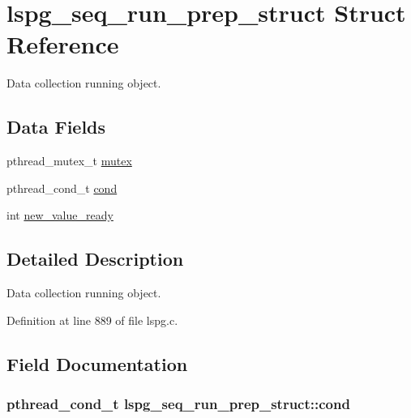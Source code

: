 \hypertarget{structlspg__seq__run__prep__struct}{\section{lspg\-\_\-seq\-\_\-run\-\_\-prep\-\_\-struct Struct Reference}
\label{structlspg__seq__run__prep__struct}
}


Data collection running object.  


\subsection*{Data Fields}
\begin{DoxyCompactItemize}
\item 
pthread\-\_\-mutex\-\_\-t \hyperlink{structlspg__seq__run__prep__struct_ad146cb91b5f7dd8bb283092c28781fe7}{mutex}
\item 
pthread\-\_\-cond\-\_\-t \hyperlink{structlspg__seq__run__prep__struct_acd83ea6994f57377716ff01c8ee7ce43}{cond}
\item 
int \hyperlink{structlspg__seq__run__prep__struct_a42d08888327e9059ddd69ddfec31b8a9}{new\-\_\-value\-\_\-ready}
\end{DoxyCompactItemize}


\subsection{Detailed Description}
Data collection running object. 

Definition at line 889 of file lspg.\-c.



\subsection{Field Documentation}
\hypertarget{structlspg__seq__run__prep__struct_acd83ea6994f57377716ff01c8ee7ce43}{
\subsubsection[{cond}]{\setlength{\rightskip}{0pt plus 5cm}pthread\-\_\-cond\-\_\-t lspg\-\_\-seq\-\_\-run\-\_\-prep\-\_\-struct\-::cond}}\label{structlspg__seq__run__prep__struct_acd83ea6994f57377716ff01c8ee7ce43}


